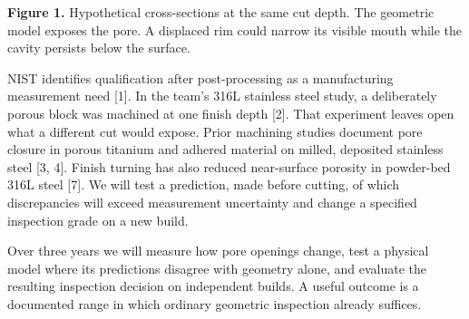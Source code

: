 \documentclass[11pt,letterpaper]{article}
\begin{document}
\begin{center}


\end{center}

{\small\textbf{Figure 1.} Hypothetical cross-sections at the same cut depth. The geometric model exposes the pore. A displaced rim could narrow its visible mouth while the cavity persists below the surface.}

NIST identifies qualification after post-processing as a manufacturing measurement need [1]. In the team’s 316L stainless steel study, a deliberately porous block was machined at one finish depth [2]. That experiment leaves open what a different cut would expose. Prior machining studies document pore closure in porous titanium and adhered material on milled, deposited stainless steel [3, 4]. Finish turning has also reduced near-surface porosity in powder-bed 316L steel [7]. We will test a prediction, made before cutting, of which discrepancies will exceed measurement uncertainty and change a specified inspection grade on a new build.

Over three years we will measure how pore openings change, test a physical model where its predictions disagree with geometry alone, and evaluate the resulting inspection decision on independent builds. A useful outcome is a documented range in which ordinary geometric inspection already suffices.
\end{document}
